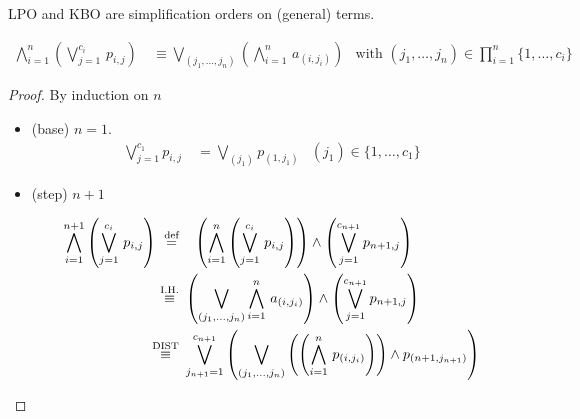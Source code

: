 \begin{lemma}
	LPO and KBO are simplification orders on (general) terms.
\end{lemma}

\begin{lemma}
	\begin{align*}
	\bigwedge_{i=1}^{n} 
	\left(	
		\bigvee_{j=1}^{c_i}\,p_{i,j} 
	\right)
	\ &\equiv
	\bigvee_{(j_1,\ldots,j_n)}
	\left(
		\bigwedge_{i=1}^{n}\,a_{(i,j_i)}
	\right)
	&\text{with }(j_1,\ldots,j_n)\in\prod_{i=1}^{n}\{ 1,\ldots,c_i \}
	\end{align*}
\end{lemma}
\begin{proof}By induction on $n$
	\begin{itemize}
		\item (base) $n=1$.
		\begin{align*}
		\bigvee_{j=1}^{c_1} p_{i,j}\ &= \bigvee_{(j_1)} p_{(1,j_1)} 
		&
		(j_1) \in \{ 1,\ldots, c_1 \}
		\end{align*}
		
		\item (step) $n+1$
		
		\begin{align*}
		\bigwedge_{i=1}^{n+1} 
		\left(	
			\bigvee_{j=1}^{c_i}\,p_{i,j} 
		\right)
		\ \defEQ&\quad
		\left( 
			\bigwedge_{i=1}^{n} 
			\left(
				\bigvee_{j=1}^{c_i}\,p_{i,j}
			\right)
		\right)
%		
		\land 
		\left(\bigvee_{j=1}^{c_{n+1}} p_{n+1,j}\right)
		\\
		\defEV[I.H.]&\ 
		\left(
		\bigvee_{(j_1,\ldots,j_n)}
		\bigwedge_{i=1}^{n}\,a_{(i,j_i)}
		\right)
		\land 
		\left(\bigvee_{j=1}^{c_{n+1}} p_{n+1,j}\right)
		\\
		\defEV[DIST]&\ 
		\bigvee_{j_{n+1}=1}^{c_{n+1}}
		\left(
		\bigvee_{(j_1,\ldots,j_n)}
		\left(\left(
		\bigwedge_{i=1}^{n}\,p_{(i,j_i)}
		\right)\right)
		\land p_{(n+1,j_{n+1})}
		\right)
		\end{align*}
		
		
	\end{itemize}
\end{proof}
